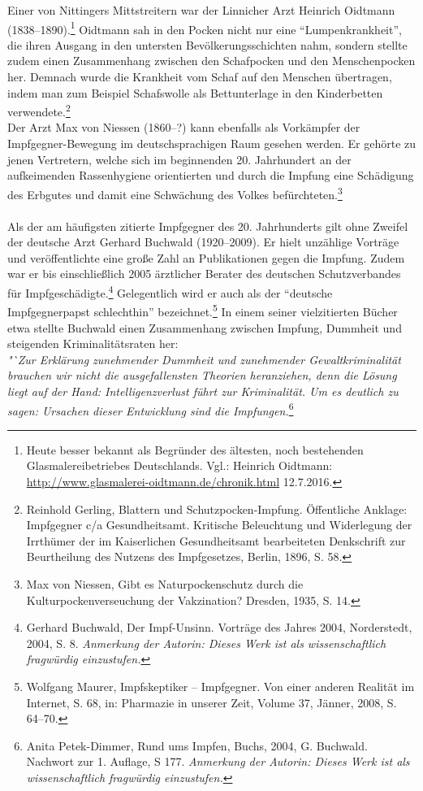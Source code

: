 \documentclass[
    a4paper,
    12pt,
    hyphens,
    chapterprefix=true,
    headheight=33pt,
    footheight=29pt,
    headings=optiontohead,
]{scrartcl}
\begin{document}
Einer von Nittingers Mittstreitern war der Linnicher Arzt Heinrich Oidtmann (1838--1890).\footnote{Heute besser bekannt als Begründer des ältesten, noch bestehenden Glasmalereibetriebes Deutschlands. Vgl.: Heinrich Oidtmann: \url{http://www.glasmalerei-oidtmann.de/chronik.html} 12.7.2016.} Oidtmann sah in den Pocken nicht nur eine "`Lumpenkrankheit"', die ihren Ausgang in den untersten Bevölkerungsschichten nahm, sondern stellte zudem einen Zusammenhang zwischen den Schafpocken und den Menschenpocken her. Demnach wurde die Krankheit vom Schaf auf den Menschen übertragen, indem man zum Beispiel Schafswolle als Bettunterlage in den Kinderbetten verwendete.\footnote{Reinhold Gerling, Blattern und Schutzpocken-Impfung. Öffentliche Anklage: Impfgegner c/a Gesundheitsamt. Kritische  Beleuchtung  und  Widerlegung  der  Irrthümer der  im  Kaiserlichen  Gesundheitsamt  bearbeiteten  Denkschrift  zur Beurtheilung  des  Nutzens  des  Impfgesetzes, Berlin, 1896, S. 58.}\\
Der Arzt Max von Niessen (1860--?) kann ebenfalls als Vorkämpfer der Impfgegner-Bewegung im  deutschsprachigen Raum gesehen werden. Er gehörte zu jenen Vertretern, welche sich im beginnenden 20. Jahrhundert an der aufkeimenden Rassenhygiene orientierten und durch die Impfung eine Schädigung des Erbgutes und damit eine Schwächung des Volkes befürchteten.\footnote{Max von Niessen, Gibt es Naturpockenschutz durch die Kulturpockenverseuchung der Vakzination? Dresden, 1935, S. 14.}\\
\\
Als der am häufigsten zitierte Impfgegner des 20. Jahrhunderts gilt ohne Zweifel der deutsche Arzt Gerhard Buchwald (1920--2009). Er hielt unzählige Vorträge und veröffentlichte eine große Zahl an Publikationen gegen die Impfung. Zudem war er bis einschließlich 2005 ärztlicher Berater des deutschen Schutzverbandes für Impfgeschädigte.\footnote{Gerhard Buchwald, Der Impf-Unsinn. Vorträge des Jahres 2004, Norderstedt, 2004, S. 8. \textit{Anmerkung der Autorin: Dieses Werk ist als wissenschaftlich fragwürdig einzustufen.}} Gelegentlich wird er auch als der "`deutsche Impfgegnerpapst schlechthin"' bezeichnet.\footnote{Wolfgang Maurer, Impfskeptiker -- Impfgegner. Von einer anderen Realität im Internet, S. 68, in: Pharmazie in unserer Zeit, Volume 37, Jänner, 2008, S. 64--70.} In einem seiner vielzitierten Bücher etwa stellte Buchwald einen Zusammenhang zwischen Impfung, Dummheit und steigenden Kriminalitätsraten her:\\
\textit{"`Zur Erklärung zunehmender Dummheit und zunehmender Gewaltkriminalität brauchen wir nicht die ausgefallensten Theorien heranziehen, denn die Lösung liegt auf der Hand: Intelligenzverlust führt zur Kriminalität. Um es deutlich zu sagen: Ursachen dieser Entwicklung sind die Impfungen.\grqq}\footnote{Anita Petek-Dimmer, Rund ums Impfen, Buchs, 2004, G. Buchwald. Nachwort zur 1. Auflage, S 177. \textit{Anmerkung der Autorin: Dieses Werk ist als wissenschaftlich fragwürdig einzustufen.}}\\
\end{document}
